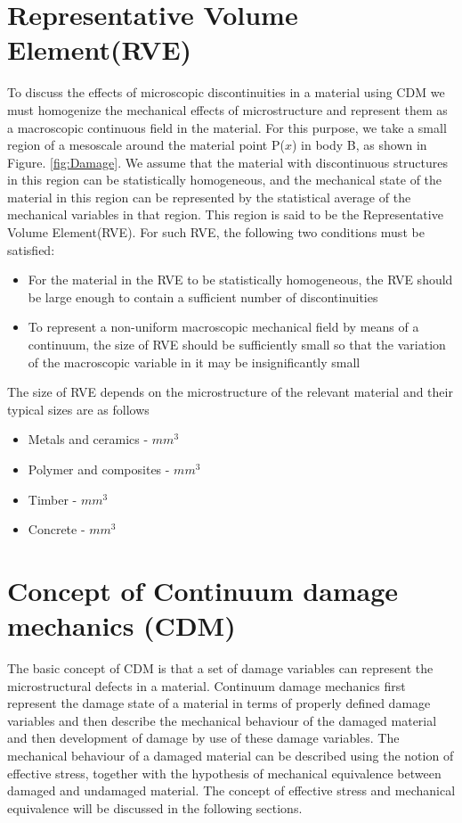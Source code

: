 \documentclass[a4paper,12pt,twoside]{report}
\begin{document}
\section{Representative Volume Element(RVE)}
\indent\indent\indent  To discuss the effects of microscopic discontinuities in  a material using CDM we must homogenize the mechanical effects of microstructure and represent them as a macroscopic continuous field in the material. For this purpose, we take a small region of a mesoscale around the material point P($x$) in body B, as shown in Figure. \ref{fig:Damage}. We assume that the  material with discontinuous structures in this region can be statistically homogeneous, and the mechanical state of the material in this region can be represented by the statistical average of the mechanical variables in that region. This region is said to be the Representative Volume Element(RVE). For such RVE, the following two conditions must be satisfied:
\begin{itemize}
\item  For the material in the RVE to be statistically homogeneous, the RVE should be large enough to contain a sufficient number of discontinuities
\item To represent a non-uniform macroscopic mechanical field by means of a continuum, the size of RVE should be sufficiently small so that the variation of the macroscopic variable in it may be insignificantly small
\end{itemize}
The size of RVE depends on the microstructure of the relevant material and their typical sizes are as follows
\begin{itemize}
\item Metals and ceramics  \;    -    $mm^3$
\item Polymer and composites \;   -   $mm^3$
\item Timber\; - $mm^3$
\item Concrete \; - $mm^3$
\end{itemize}

\section{Concept of Continuum damage mechanics (CDM)}
\indent\indent\indent The basic concept of CDM is that a set of damage variables can represent the microstructural defects in a material. Continuum damage mechanics first represent the damage state of a material in terms of properly defined damage variables and then describe the mechanical behaviour of the damaged material and then development of damage by use of these damage variables. The mechanical behaviour of a damaged material can be described using the notion of effective stress, together with the hypothesis of mechanical equivalence between damaged and undamaged material. The concept of effective stress and mechanical equivalence will be discussed in the following sections.
\end{document}
